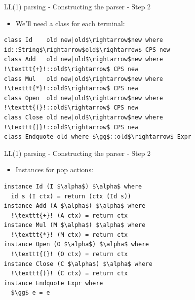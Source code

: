 \documentclass[10pt]{beamer}
\begin{document}
\begin{frame}[fragile]{LL(1) parsing - Constructing the parser - Step 2}

\begin{itemize}
\item We'll need a class for each terminal:

\end{itemize}

\begin{lstlisting}[mathescape=true, escapechar=!]
class Id    old new|old$\rightarrow$new where id::String$\rightarrow$old$\rightarrow$ CPS new
class Add   old new|old$\rightarrow$new where !\texttt{+}!::old$\rightarrow$ CPS new
class Mul   old new|old$\rightarrow$new where !\texttt{*}!::old$\rightarrow$ CPS new
class Open  old new|old$\rightarrow$new where !\texttt{(}!::old$\rightarrow$ CPS new
class Close old new|old$\rightarrow$new where !\texttt{)}!::old$\rightarrow$ CPS new
class Endquote old where $\gg$::old$\rightarrow$ Expr
\end{lstlisting}

\end{frame}

\begin{frame}[fragile]{LL(1) parsing - Constructing the parser - Step 2}

\begin{itemize}
\item Instances for pop actions:
\end{itemize}

\begin{lstlisting}[mathescape=true, escapechar=!]
instance Id (I $\alpha$) $\alpha$ where
  id s (I ctx) = return (ctx (Id s))
instance Add (A $\alpha$) $\alpha$ where
  !\texttt{+}! (A ctx) = return ctx
instance Mul (M $\alpha$) $\alpha$ where
  !\texttt{*}! (M ctx) = return ctx
instance Open (O $\alpha$) $\alpha$ where
  !\texttt{(}! (O ctx) = return ctx
instance Close (C $\alpha$) $\alpha$ where
  !\texttt{)}! (C ctx) = return ctx
instance Endquote Expr where
  $\gg$ e = e
\end{lstlisting}

\end{frame}
\end{document}
